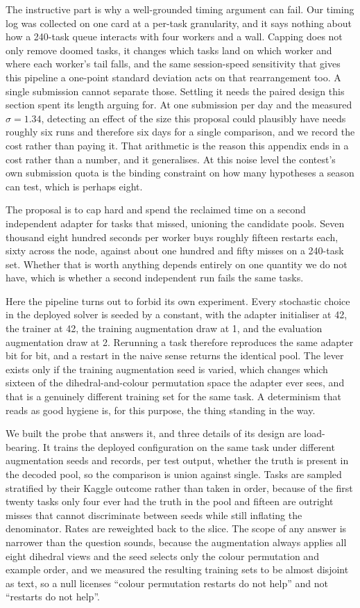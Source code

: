 \documentclass[11pt]{article}
\begin{document}
The instructive part is why a well-grounded timing argument can fail. Our timing log was collected
on one card at a per-task granularity, and it says nothing about how a 240-task queue interacts with
four workers and a wall. Capping does not only remove doomed tasks, it changes which tasks land on
which worker and where each worker's tail falls, and the same session-speed sensitivity that gives
this pipeline a one-point standard deviation acts on that rearrangement too. A single submission
cannot separate those. Settling it needs the paired design this section spent its length arguing
for. At one submission per day and the measured $\sigma = 1.34$, detecting an effect of the size this
proposal could plausibly have needs roughly six runs and therefore six days for a single comparison,
and we record the cost rather than paying it. That arithmetic is the reason this appendix ends in a
cost rather than a number, and it generalises. At this noise level the contest's own submission quota
is the binding constraint on how many hypotheses a season can test, which is perhaps eight.

The proposal is to cap hard and spend the reclaimed time on a second independent adapter for tasks that
missed, unioning the candidate pools. Seven thousand eight hundred seconds per worker buys roughly
fifteen restarts each, sixty across the node, against about one hundred and fifty misses on a 240-task
set. Whether that is worth anything depends entirely on one quantity we do not have, which is whether a second
independent run fails the same tasks.

Here the pipeline turns out to forbid its own experiment. Every stochastic choice in the deployed solver
is seeded by a constant, with the adapter initialiser at 42, the trainer at 42, the training augmentation
draw at 1, and the evaluation augmentation draw at 2. Rerunning a task therefore reproduces the same
adapter bit for bit, and a restart in the naive sense returns the identical pool. The lever exists only
if the training augmentation seed is varied, which changes which sixteen of the dihedral-and-colour
permutation space the adapter ever sees, and that is a genuinely different training set for the same
task. A determinism that reads as good hygiene is, for this purpose, the thing standing in the way.

We built the probe that answers it, and three details of its design are load-bearing. It trains the
deployed configuration on the same task under different augmentation seeds and records, per test
output, whether the truth is present in the decoded pool, so the comparison is union against single.
Tasks are sampled stratified by their Kaggle outcome rather than taken in order, because of the first
twenty tasks only four ever had the truth in the pool and fifteen are outright misses that cannot
discriminate between seeds while still inflating the denominator. Rates are reweighted back to the
slice. The scope of any answer is narrower than the question sounds, because the augmentation always applies
all eight dihedral views and the seed selects only the colour permutation and example order, and we
measured the resulting training sets to be almost disjoint as text, so a null licenses ``colour
permutation restarts do not help'' and not ``restarts do not help''.
\end{document}
